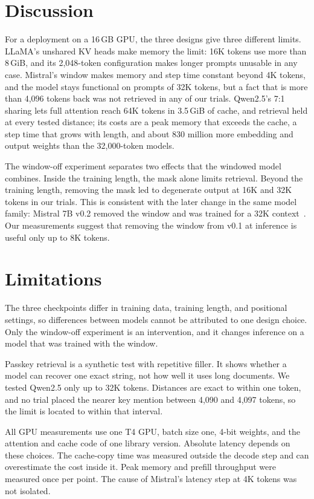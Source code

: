 \documentclass[conference]{IEEEtran}
\begin{document}
\section{Discussion}
For a deployment on a 16\,GB GPU, the three designs give three different limits. LLaMA's unshared KV heads make memory the limit: 16K tokens use more than 8\,GiB, and its 2,048-token configuration makes longer prompts unusable in any case. Mistral's window makes memory and step time constant beyond 4K tokens, and the model stays functional on prompts of 32K tokens, but a fact that is more than 4,096 tokens back was not retrieved in any of our trials. Qwen2.5's 7:1 sharing lets full attention reach 64K tokens in 3.5\,GiB of cache, and retrieval held at every tested distance; its costs are a peak memory that exceeds the cache, a step time that grows with length, and about 830 million more embedding and output weights than the 32,000-token models.

The window-off experiment separates two effects that the windowed model combines. Inside the training length, the mask alone limits retrieval. Beyond the training length, removing the mask led to degenerate output at 16K and 32K tokens in our trials. This is consistent with the later change in the same model family: Mistral 7B v0.2 removed the window and was trained for a 32K context~\cite{mistralv02}. Our measurements suggest that removing the window from v0.1 at inference is useful only up to 8K tokens.

\section{Limitations}
The three checkpoints differ in training data, training length, and positional settings, so differences between models cannot be attributed to one design choice. Only the window-off experiment is an intervention, and it changes inference on a model that was trained with the window.

Passkey retrieval is a synthetic test with repetitive filler. It shows whether a model can recover one exact string, not how well it uses long documents. We tested Qwen2.5 only up to 32K tokens. Distances are exact to within one token, and no trial placed the nearer key mention between 4,090 and 4,097 tokens, so the limit is located to within that interval.

All GPU measurements use one T4 GPU, batch size one, 4-bit weights, and the attention and cache code of one library version. Absolute latency depends on these choices. The cache-copy time was measured outside the decode step and can overestimate the cost inside it. Peak memory and prefill throughput were measured once per point. The cause of Mistral's latency step at 4K tokens was not isolated.
\end{document}
